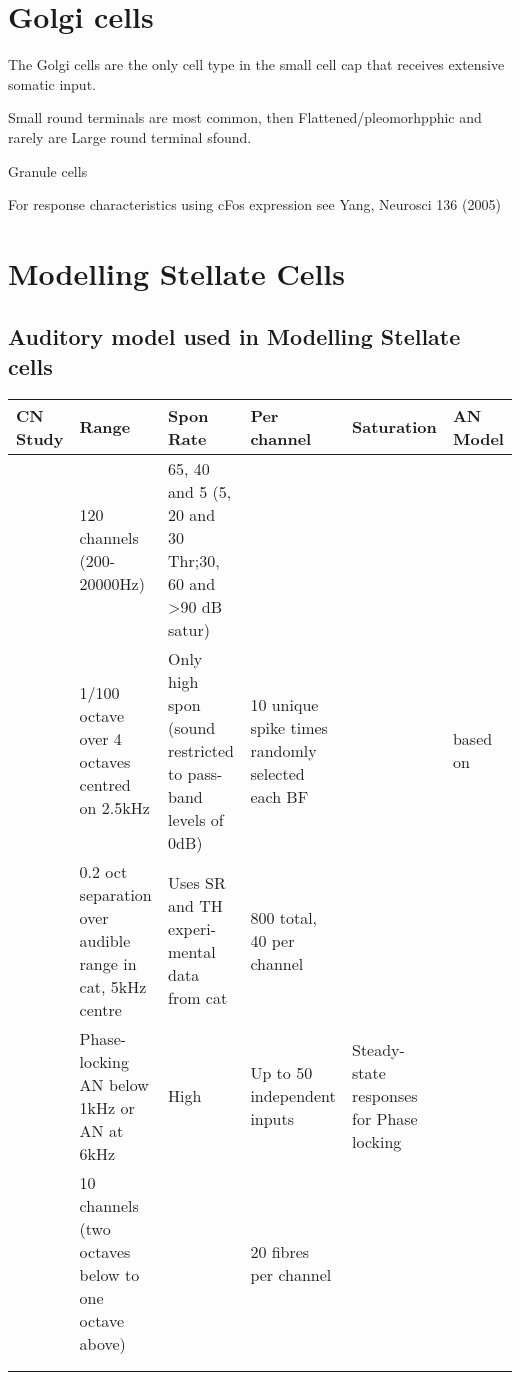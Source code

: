 \documentclass[10pt,a4paper]{article}
\begin{document}
\section{Golgi cells}

\citep{Cant:1993,MugnainiOsenEtAl:1980}

The Golgi cells are the only cell type in the small cell cap that receives
extensive somatic input.

Small round terminals are most common, then Flattened/pleomorhpphic and rarely
are Large round terminal sfound.

Granule cells

For response characteristics using cFos expression see Yang, Neurosci 136 (2005)



\section{Modelling Stellate Cells}
\subsection{Auditory model used in Modelling Stellate cells}


\begin{table}[htp]
  \centering
      \begin{tabularx}{\textwidth}{XXXXXX}
        \toprule
 CN Study & Range & Spon Rate & Per channel & Saturation & AN        Model\\\midrule
 \citep{ErikssonRobert:1999} & 120 channels (200-20000Hz) &        65, 40 and 5 (5, 20 and 30 Thr;30, 60 and {\textgreater}90 dB satur) & &        & \citep{RobertEriksson:1999}\\\hline
 \citep{ReissYoung:2005} & 1/100        octave over 4 octaves centred on 2.5kHz & Only high spon (sound        restricted to pass-band levels of 0dB) & 10 unique spike times randomly        selected each BF & & \citep{BruceSachsEtAl:2003} based on        \citep{ZhangHeinzEtAl:2001} \\\hline
 \citep{HancockVoigt:1999} & 0.2 oct        separation over audible range in cat, 5kHz centre \citep{Liberman:1978}        & Uses SR and TH experi-mental data from cat \citep{Liberman:1978} & 800        total, 40 per channel & & \citep{Carney:1993}\\\hline  
      \citep{ErikssonRobert:1999} &        Phase-locking AN below 1kHz or AN at 6kHz & High & Up to 50 independent        inputs & Steady-state responses for Phase locking &        \citep{RobertEriksson:1999}\\\hline
 \citep{PressnitzerMeddisEtAl:2001}& 10        channels (two octaves below to one octave above) & & 20 fibres per        channel & & \citep{MeddisHewittEtAl:1990}\\\hline

\citep{BahmerLangner:2006,BahmerLangner:2006a} &&&&&\\ \hline

\citep{WiegrebeMeddis:2004} &&&&&\\ 
\bottomrule
      \end{tabularx}
\end{table}
\end{document}
